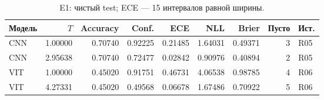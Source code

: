 \begin{table}[H]\centering\scriptsize
\setlength{\tabcolsep}{4pt}
\caption{E1: чистый test; ECE --- 15 интервалов равной ширины.}\label{tab:e1}
\begin{tabular}{lrrrrrrrl}
\toprule
Модель & $T$ & Accuracy & Conf. & ECE & NLL & Brier & Пусто & Ист. \\
\midrule
CNN & 1.00000 & 0.70740 & 0.92225 & 0.21485 & 1.64031 & 0.49371 & 3 & R05 \\
CNN & 2.95638 & 0.70740 & 0.72477 & 0.02842 & 0.90976 & 0.40894 & 2 & R05 \\
VIT & 1.00000 & 0.45020 & 0.91751 & 0.46731 & 4.06538 & 0.98785 & 4 & R06 \\
VIT & 4.27331 & 0.45020 & 0.49568 & 0.06678 & 1.67486 & 0.70922 & 5 & R06 \\
\bottomrule
\end{tabular}
\end{table}
